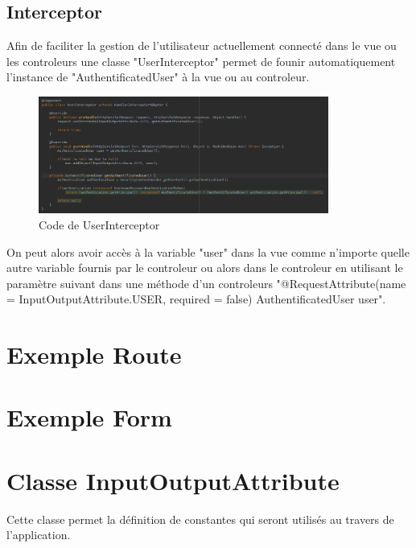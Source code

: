 		\subsection{Interceptor}

			Afin de faciliter la gestion de l'utilisateur actuellement connecté dans le vue ou les controleurs une classe "UserInterceptor" permet de founir automatiquement l'instance de "AuthentificatedUser" à la vue ou au controleur.

			\begin{figure}[H]
				\centering\includegraphics[width=0.85\textwidth, keepaspectratio]{res/UserInterceptor.png}
				\caption{Code de UserInterceptor}
			\end{figure}

			On peut alors avoir accès à la variable "user" dans la vue comme n'importe quelle autre variable fournis par le controleur ou alors dans le controleur en utilisant le paramètre suivant dans une méthode d'un controleurs "@RequestAttribute(name = InputOutputAttribute.USER, required = false) AuthentificatedUser user".

	\section{Exemple Route}


	\section{Exemple Form}


	\section{Classe InputOutputAttribute}

		Cette classe permet la définition de constantes qui seront utilisés au travers de l'application.

